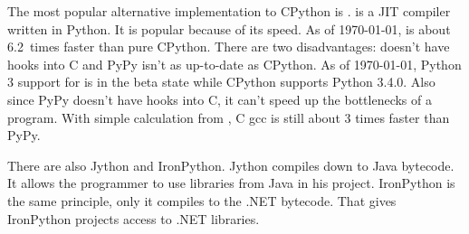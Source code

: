 The most popular alternative implementation to CPython is \pypy. \pypy{} is a JIT
compiler written in Python. It is popular because of its speed. As of \today,
\pypy{} is about 6.2~times faster than pure
CPython.\cite{website:python-pypy-speed} There are two disadvantages: \pypy{}
doesn't have hooks into C and PyPy isn't as up-to-date as CPython. As of \today,
Python 3 support for \pypy is in the beta state while CPython supports Python
3.4.0. Also since PyPy doesn't have hooks into C, it can't speed up the
bottlenecks of a program. With simple calculation from
\cite{website:c-vs-python,website:python-pypy-speed}, C gcc is still about 3
times faster than PyPy.

There are also Jython and IronPython. Jython compiles down to Java bytecode. It
allows the programmer to use libraries from Java in his project. IronPython is
the same principle, only it compiles to the .NET bytecode. That gives IronPython
projects access to .NET libraries.